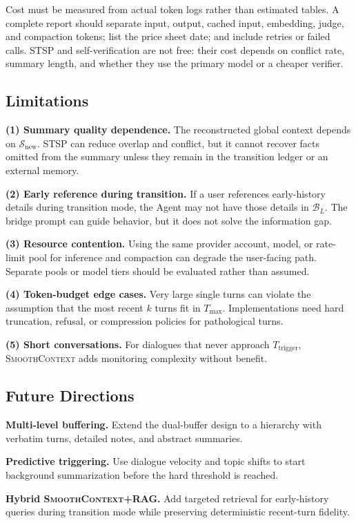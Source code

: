 \documentclass[10pt,twocolumn]{article}
\newcommand{\sys}{\textsc{SmoothContext}}
\newcommand{\bufL}{\mathcal{B}_L}
\newcommand{\Tmax}{T_{\max}}
\newcommand{\Ttrig}{T_{\mathrm{trigger}}}
\begin{document}
Cost must be measured from actual token logs rather than estimated tables. A complete report should separate input, output, cached input, embedding, judge, and compaction tokens; list the price sheet date; and include retries or failed calls. STSP and self-verification are not free: their cost depends on conflict rate, summary length, and whether they use the primary model or a cheaper verifier.

\subsection{Limitations}

\textbf{(1) Summary quality dependence.} The reconstructed global context depends on $\mathcal{S}_{\mathrm{new}}$. STSP can reduce overlap and conflict, but it cannot recover facts omitted from the summary unless they remain in the transition ledger or an external memory.

\textbf{(2) Early reference during transition.} If a user references early-history details during transition mode, the Agent may not have those details in $\bufL$. The bridge prompt can guide behavior, but it does not solve the information gap.

\textbf{(3) Resource contention.} Using the same provider account, model, or rate-limit pool for inference and compaction can degrade the user-facing path. Separate pools or model tiers should be evaluated rather than assumed.

\textbf{(4) Token-budget edge cases.} Very large single turns can violate the assumption that the most recent $k$ turns fit in $\Tmax$. Implementations need hard truncation, refusal, or compression policies for pathological turns.

\textbf{(5) Short conversations.} For dialogues that never approach $\Ttrig$, \sys{} adds monitoring complexity without benefit.

\subsection{Future Directions}

\textbf{Multi-level buffering.} Extend the dual-buffer design to a hierarchy with verbatim turns, detailed notes, and abstract summaries.

\textbf{Predictive triggering.} Use dialogue velocity and topic shifts to start background summarization before the hard threshold is reached.

\textbf{Hybrid \sys{}+RAG.} Add targeted retrieval for early-history queries during transition mode while preserving deterministic recent-turn fidelity.
\end{document}
